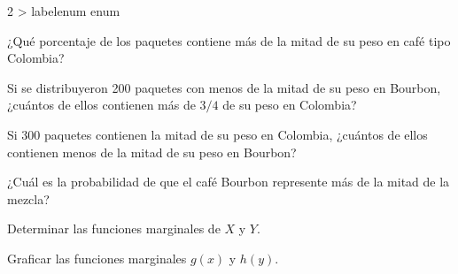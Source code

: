\documentclass[10pt,letterpaper]{article}
\makeatletter
\renewenvironment{enumerate}
  {\ifnum \@enumdepth >\thr@@\@toodeep\else
   \advance\@enumdepth\@ne
   \edef\@enumctr{enum\romannumeral\the\@enumdepth}%
   \expandafter\list\csname label\@enumctr\endcsname
     {\usecounter\@enumctr
      \setlength{\topsep}{3pt}%
      \setlength{\itemsep}{2pt}%
      \setlength{\parsep}{0pt}%
      \setlength{\partopsep}{0pt}%
      \setlength{\leftmargin}{1.6em}%
      \setlength{\labelsep}{0.4em}}%
   \fi}
  {\endlist}
\makeatother
\begin{document}
\begin{multicols}{2}
\begin{enumerate}
\item ¿Qué porcentaje de los paquetes contiene más de la mitad de su peso en
café tipo Colombia?
\item Si se distribuyeron 200 paquetes con menos de la mitad de su peso en
Bourbon, ¿cuántos de ellos contienen más de \(3/4\) de su peso en Colombia?
\item Si 300 paquetes contienen la mitad de su peso en Colombia, ¿cuántos de
ellos contienen menos de la mitad de su peso en Bourbon?
\item ¿Cuál es la probabilidad de que el café Bourbon represente más de la
mitad de la mezcla?
\item Determinar las funciones marginales de \(X\) y \(Y\).
\item Graficar las funciones marginales \(g(x)\) y \(h(y)\).
\end{enumerate}

\end{multicols}
\end{document}
